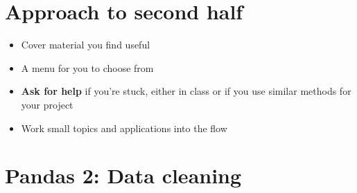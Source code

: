 \documentclass[11pt]{article}
\begin{document}
\section*{Approach to second half}

\begin{itemize}
\item Cover material you find useful
\item A menu for you to choose from
\item {\bf Ask for help} if you're stuck, either in class or if you use similar methods for your project
\item Work small topics and applications into the flow 
\end{itemize} 


\section*{Pandas 2:  Data cleaning} 
\end{document}
